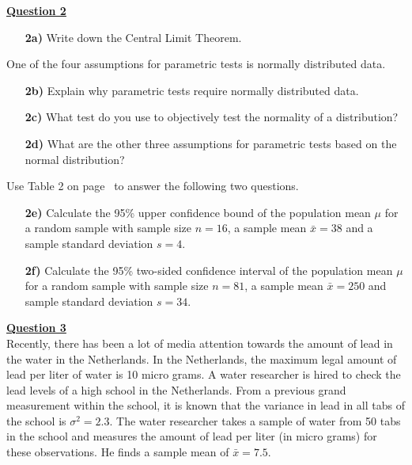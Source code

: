 \underline{\textbf{Question 2}} \\

\begin{itemize}

    \item[\textbf{2a)}] Write down the Central Limit Theorem.
    
\end{itemize}
    
    One of the four assumptions for parametric tests is normally distributed data.

\begin{itemize}
    
    \item[\textbf{2b)}] Explain why parametric tests require normally distributed data.
    
    \item[\textbf{2c)}] What test do you use to objectively test the normality of a distribution? 
    
    \item[\textbf{2d)}] What are the other three assumptions for parametric tests based on the normal distribution? 

\end{itemize}
    
    Use Table 2 on page~\pageref{table2} to answer the following two questions.
    
\begin{itemize}
    
    \item[\textbf{2e)}] Calculate the 95\% upper confidence bound of the population mean $\mu$ for a random sample with sample size $n = 16$, a sample mean $\bar{x} = 38$ and a sample standard deviation $s = 4$. 
    
    \item[\textbf{2f)}] Calculate the 95\% two-sided confidence interval of the population mean $\mu$ for a random sample with sample size $n = 81$, a sample mean $\bar{x} = 250$ and sample standard deviation $s = 34$.

\end{itemize}

\clearpage %

\underline{\textbf{Question 3}} \\

Recently, there has been a lot of media attention towards the amount of lead in the water in the Netherlands. In the Netherlands, the maximum legal amount of lead per liter of water is 10 micro grams. A water researcher is hired to check the lead levels of a high school in the Netherlands. From a previous grand measurement within the school, it is known that the variance in lead in all tabs of the school is $\sigma^2 = 2.3$. The water researcher takes a sample of water from 50 tabs in the school and measures the amount of lead per liter (in micro grams) for these observations. He finds a sample mean of $\bar{x} = 7.5$.  \\

